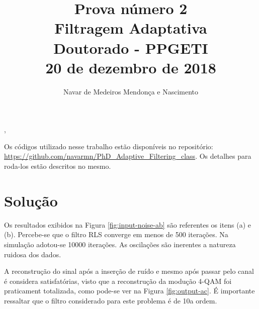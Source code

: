 \documentclass[review]{elsarticle}
\begin{document}
\begin{frontmatter}

\title{Prova número 2 \\ Filtragem Adaptativa \\ Doutorado - PPGETI \\ 20 de dezembro de 2018}

\author[]{Navar de Medeiros Mendonça e Nascimento}
 \sep

\end{frontmatter}


Os códigos utilizado nesse trabalho estão disponíveis no repositório: \url{https://github.com/navarmn/PhD_Adaptive_Filtering_class}. Os detalhes para roda-los estão descritos no mesmo.

\section{Solução}

Os resultados exibidos na Figura \ref{fig:input-noise-ab} são referentes os itens (a) e (b). Percebe-se que o filtro RLS converge em menos de 500 iterações. Na simulação adotou-se 10000 iterações. As oscilações são inerentes a natureza ruidosa dos dados. 

A reconstrução do sinal após a inserção de ruído e mesmo após passar pelo canal é considera satisfatórias, visto que a reconstrução da modução 4-QAM foi praticament totalizada, como pode-se ver na Figura \ref{fig:output-ac}. É importante ressaltar que o filtro considerado para este problema é de 10a ordem.
\end{document}
